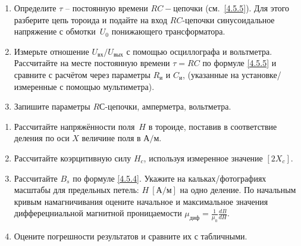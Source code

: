 \begin{lab:task}
\begin{enumerate}
\item
Определите $\tau$ -- постоянную времени $RC-$цепочки (см.~\eqref{4.5.5}). Для
этого разберите цепь тороида и подайте на вход $RC$-цепочки синусоидальное напряжение
с обмотки~$U_0$ понижающего трансформатора.

\item
Измерьте отношение $U_\text{вх} / U_\text{вых}$ с помощью осциллографа и
вольтметра. Рассчитайте на месте постоянную времени $\tau=RC$ по формуле
\eqref{4.5.5} и сравните с расчётом через параметры $R_\text{и}$ и $C_\text{и}$,
(указанные на установке/измеренные с помощью мультиметра).

\item
Запишите параметры $RС$-цепочки, амперметра, вольтметра.
\end{enumerate}

\begin{enumerate}

\item
Рассчитайте напряжённости поля~$H$ в тороиде, поставив в соответствие деления по
оси $X$ величине поля в $\text{А} / \text{м}$.

\item
Рассчитайте коэрцитивную силу $H_c$, используя измеренное значение $[2X_c]$.

\item
Рассчитайте $B_s$ по формуле \eqref{4.5.4}. Укажите на
кальках/фотографиях масштабы для предельных петель: $H~[\text{А} / \text{м}]$ на одно
деление. По начальным кривым намагничивания
оцените начальное и максимальное значения дифферецниальной
магнитной проницаемости $\mu_\text{диф}=\frac{1}{\mu_0}\frac{dB}{dH}$.

\item
Оцените погрешности результатов и сравните их с табличными.

\end{enumerate}
\end{lab:task}

